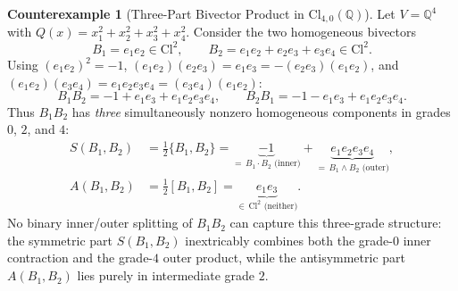 \documentclass[11pt]{article}
\theoremstyle{plain}
\theoremstyle{definition}
\newtheorem{counterexample}[theorem]{Counterexample}
\theoremstyle{remark}
\newcommand{\Cl}{\mathrm{Cl}}
\begin{document}
\begin{counterexample}[Three-Part Bivector Product in $\Cl_{4,0}(\mathbb{Q})$]\label{cex:cl4}
Let $V = \mathbb{Q}^4$ with $Q(x) = x_1^2 + x_2^2 + x_3^2 + x_4^2$. Consider the two homogeneous bivectors
\[
  B_1 = e_1 e_2 \in \Cl^2, \qquad B_2 = e_1 e_2 + e_2 e_3 + e_3 e_4 \in \Cl^2.
\]
Using $(e_1 e_2)^2 = -1$, $(e_1 e_2)(e_2 e_3) = e_1 e_3 = -(e_2 e_3)(e_1 e_2)$, and $(e_1 e_2)(e_3 e_4) = e_1 e_2 e_3 e_4 = (e_3 e_4)(e_1 e_2)$:
\[
  B_1 B_2 = -1 + e_1 e_3 + e_1 e_2 e_3 e_4, \qquad
  B_2 B_1 = -1 - e_1 e_3 + e_1 e_2 e_3 e_4.
\]
Thus $B_1 B_2$ has \emph{three} simultaneously nonzero homogeneous components in grades $0$, $2$, and $4$:
\begin{align*}
  S(B_1, B_2) &= \frac{1}{2}\{B_1, B_2\} = \underbrace{-1}_{=\, B_1 \cdot B_2 \text{ (inner)}} + \underbrace{e_1 e_2 e_3 e_4}_{=\, B_1 \wedge B_2 \text{ (outer)}},\\
  A(B_1, B_2) &= \frac{1}{2}[B_1, B_2] = \underbrace{e_1 e_3}_{\in\, \Cl^2 \text{ (neither)}}.
\end{align*}
No binary inner/outer splitting of $B_1 B_2$ can capture this three-grade structure: the symmetric part $S(B_1, B_2)$ inextricably combines both the grade-$0$ inner contraction and the grade-$4$ outer product, while the antisymmetric part $A(B_1, B_2)$ lies purely in intermediate grade $2$.
\end{counterexample}
\end{document}
